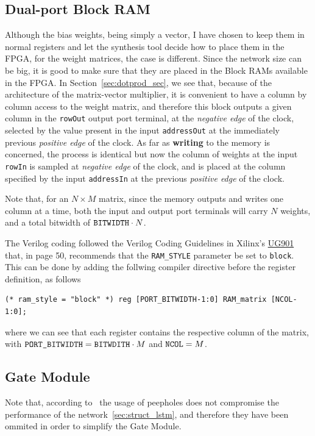 \subsection{Dual-port Block RAM}
Although the bias weights, being simply a vector, I have chosen to keep them in normal registers and let the synthesis tool decide how to place them in the FPGA, for the weight matrices, the case is different. Since the
network size can be big, it is good to make sure that they are placed in the Block RAMs available in the FPGA. In Section~\ref{sec:dotprod_sec}, we see that, because of the architecture of the matrix-vector multiplier, it is convenient to have a column by column access to the weight matrix, and therefore this block outputs a given column in the \verb+rowOut+ output port terminal, at the \emph{negative edge} of the clock, selected by the value present in the input \verb+addressOut+ at the immediately previous \emph{positive edge} of the clock. As far as \textbf{writing} to the memory is concerned, the process is identical but now the column of weights at the input \verb+rowIn+ is sampled at \emph{negative edge} of the clock, and is placed at the column specified by the input \verb+addressIn+ at the previous \emph{positive edge} of the clock. 

Note that, for an $N \times M$ matrix, since the memory outputs and writes one column at a time, both the input and output port terminals will carry $N$ weights, and a total bitwidth of $\verb+BITWIDTH+ \cdot N$. 

The Verilog coding followed the Verilog Coding Guidelines in Xilinx's \href{http://www.xilinx.com/support/documentation/sw_manuals/xilinx2015_2/ug901-vivado-synthesis.pdf}{UG901} that, in page 50, recommends that the \verb+RAM_STYLE+ parameter be set to \verb+block+. This can be done by adding the follwing compiler directive before the register definition, as follows

\begin{verbatim}
(* ram_style = "block" *) reg [PORT_BITWIDTH-1:0] RAM_matrix [NCOL-1:0];
\end{verbatim}
where we can see that each register contains the respective column of the matrix, with $\verb+PORT_BITWIDTH+ = \verb+BITWDITH+ \cdot M$ and $\verb+NCOL+ = M$.
 

\subsection{Gate Module}\label{sec:gatemod} 
Note that, according to~\cite{Greff15} the usage of peepholes does not compromise the performance of the network~\ref{sec:struct_lstm}, and therefore they have been ommited in order to simplify the Gate Module.

